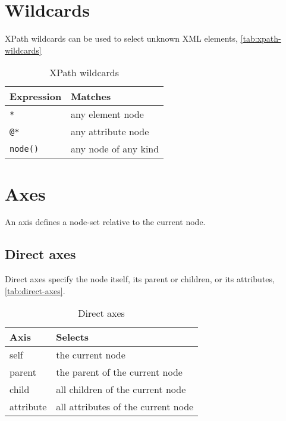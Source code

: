 \documentclass[slides]{pgnotes}
\begin{document}
\section{Wildcards}

XPath wildcards can be used to select unknown XML elements, \autoref{tab:xpath-wildcards}

\begin{table}[htbp]
  \centering
  \begin{tabular}{l l}
    \toprule
    \textbf{Expression} & \textbf{Matches} \\
    \midrule
    \texttt{*} &  any element node \\
    \texttt{@*} &  any attribute node \\
    \texttt{node()} & any node of any kind \\
    \bottomrule
  \end{tabular}
  \caption{XPath wildcards}
  \label{tab:xpath-wildcards}
\end{table}





\section{Axes}

An axis defines a node-set relative to the current node.

\subsection{Direct axes}

Direct axes specify the node itself, its parent or children, or its attributes, \autoref{tab:direct-axes}. 

\begin{table}[htbp]
  \begin{tabularx}{1.0\linewidth}{l X}
    \toprule
    \textbf{Axis} & \textbf{Selects} \\
    \midrule
    self & the current node \\
    parent & the parent of the current node \\
    child & all children of the current node \\
    attribute & all attributes of the current node \\
    \bottomrule
  \end{tabularx}
  \caption{Direct axes}
  \label{tab:direct-axes}
\end{table}
\end{document}
